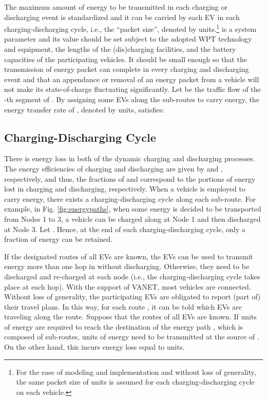 \documentclass[journal]{IEEEtran}
\begin{document}
The maximum amount of energy to be transmitted in each charging or discharging event is standardized and it can be carried by each EV in each charging-discharging cycle, i.e., the ``packet size'', denoted by  units.\footnote{For the ease of modeling and implementation and without loss of generality, the same packet size of  units is assumed for each charging-discharging cycle on each vehicle.}  is a system parameter and its value should be set subject to the adopted WPT technology and equipment, the lengths of the (dis)charging facilities, and the battery capacities of the participating vehicles. It should be small enough so that the transmission of energy packet can complete in every charging and discharging event and that an appendance or removal of an energy packet from a vehicle will not make its state-of-charge fluctuating significantly. Let  be the traffic flow of the -th segment of . By assigning some EVs along the sub-routes to carry energy, the energy transfer rate of ,
denoted by  units, satisfies:



\subsection{Charging-Discharging Cycle}
There is energy loss in both of the dynamic charging and discharging processes. The energy efficiencies of charging and discharging are given by  and , respectively, and thus, the fractions of  and  correspond to the portions of energy lost in charging and discharging, respectively. When a vehicle is employed to carry energy, there exists a charging-discharging cycle along each sub-route. For example, in Fig. \ref{fig:energypaths}, when some energy is decided to be transported from Nodes 1 to 3,  a vehicle can be charged along  at Node 1 and then discharged at Node 3. Let . Hence, at the end of each charging-discharging cycle, only a fraction  of energy can be retained. 

If the designated routes of all EVs are known, the EVs can be used to transmit energy more than one hop in  without discharging. Otherwise,
they need to be discharged and re-charged at each node (i.e., the charging-discharging cycle takes place at each hop). With the support of VANET, most vehicles are connected. Without loss of generality, the participating EVs are obligated to report (part of) their travel plans. In this way, for each route , it can be told which EVs are traveling along the route.  
Suppose that the routes of all EVs are known. If  units of energy are required to reach the destination of the energy path , which is composed of  sub-routes,  units of energy need to be transmitted at the source of . On the other hand, this incurs energy loss equal to  units.
\end{document}
